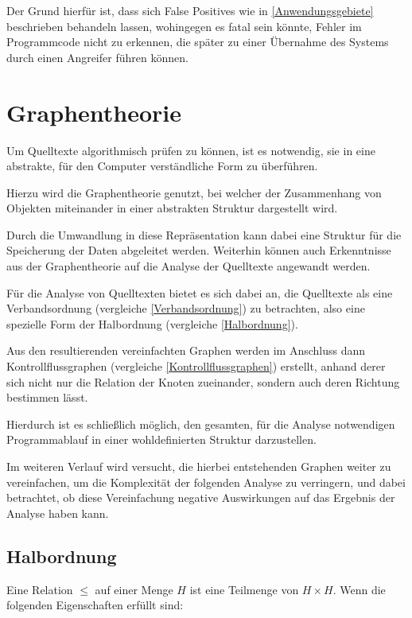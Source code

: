             Der Grund hierfür ist,
            dass sich False Positives wie
            in
            \vref{Anwendungsgebiete} beschrieben behandeln lassen,
            wohingegen es fatal sein könnte,
            Fehler im Programmcode nicht zu erkennen,
            die später zu einer Übernahme des Systems durch einen Angreifer führen können.

    \section{Graphentheorie}
        Um Quelltexte algorithmisch prüfen zu können,
        ist es notwendig,
        sie in eine abstrakte,
        für den Computer verständliche Form zu überführen.

        Hierzu wird die Graphentheorie genutzt,
        bei welcher der Zusammenhang von Objekten miteinander in einer abstrakten Struktur dargestellt wird.

        Durch die Umwandlung in diese Repräsentation kann dabei
        eine Struktur für die Speicherung der Daten abgeleitet werden.
        Weiterhin können auch Erkenntnisse aus der Graphentheorie auf die Analyse der Quelltexte angewandt werden.

        Für die Analyse von Quelltexten bietet es sich dabei an,
        die Quelltexte als eine Verbandsordnung
        (vergleiche
        \vref{Verbandsordnung}) zu betrachten,
        also eine spezielle Form der Halbordnung
        (vergleiche
        \vref{Halbordnung}).

        Aus den resultierenden vereinfachten Graphen werden im Anschluss dann Kontrollflussgraphen
        (vergleiche
        \vref{Kontrollflussgraphen}) erstellt,
        anhand derer sich nicht nur die Relation der Knoten zueinander,
        sondern auch deren Richtung bestimmen lässt.

        Hierdurch ist es schließlich möglich,
        den gesamten,
        für die Analyse notwendigen Programmablauf in einer wohldefinierten Struktur darzustellen.

        Im weiteren Verlauf wird versucht,
        die hierbei entstehenden Graphen weiter zu vereinfachen,
        um die Komplexität der folgenden Analyse zu verringern,
        und
        dabei betrachtet,
        ob diese Vereinfachung negative Auswirkungen auf das Ergebnis der Analyse haben kann.

        \subsection{Halbordnung}\label{Halbordnung}
            Eine Relation
            \( \leq \) auf einer Menge
            \( H \) ist eine Teilmenge von
            \( H \times H \).
            Wenn die folgenden Eigenschaften erfüllt sind:

